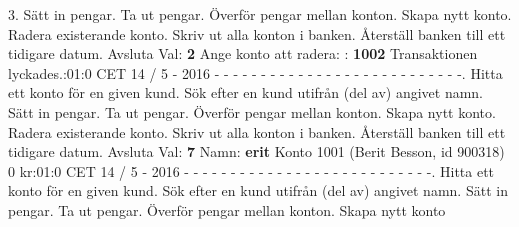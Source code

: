 \begin{multicols}{2}
3.   Sätt in pengar.   Ta ut pengar.   Överför pengar mellan konton.   Skapa nytt konto.   Radera existerande konto.   Skriv ut alla konton i banken.   Återställ banken till ett tidigare datum. Avsluta\newline
Val: \textbf{2}\newline
Ange konto att radera: : \textbf{1002}\newline
Transaktionen lyckades.:01:0 CET 14 / 5 - 2016\newline
- - - - - - - - - - - - - - - - - - - - - - - - - - -.   Hitta ett konto för en given kund.   Sök efter en kund utifrån (del av) angivet namn.   Sätt in pengar.   Ta ut pengar.   Överför pengar mellan konton.   Skapa nytt konto.   Radera existerande konto.   Skriv ut alla konton i banken.   Återställ banken till ett tidigare datum. Avsluta\newline
Val: \textbf{7}\newline
Namn: \textbf{erit}\newline
Konto 1001 (Berit Besson, id 900318) 0 kr:01:0 CET 14 / 5 - 2016\newline
- - - - - - - - - - - - - - - - - - - - - - - - - - -.   Hitta ett konto för en given kund.   Sök efter en kund utifrån (del av) angivet namn.   Sätt in pengar.   Ta ut pengar.   Överför pengar mellan konton.   Skapa nytt konto\newline

\end{multicols}
